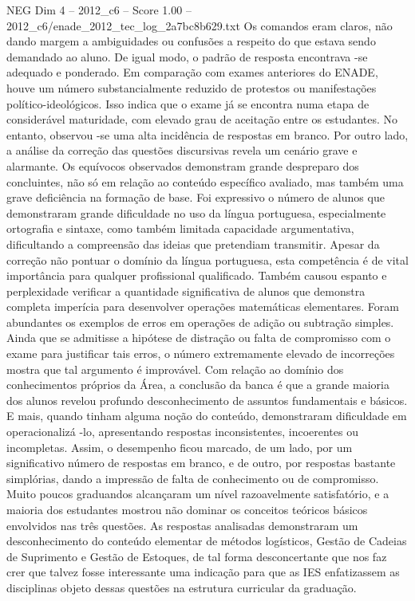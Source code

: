 \begin{textsample}{NEG Dim 4 – 2012\_c6 – Score 1.00 – 2012\_c6/enade\_2012\_tec\_log\_2a7bc8b629.txt}
Os comandos eram claros, não dando margem a ambiguidades ou confusões a respeito do que estava sendo demandado ao aluno.
De igual modo, o padrão de resposta encontrava -se adequado e ponderado.
Em comparação com exames anteriores do ENADE, houve um número substancialmente reduzido de protestos ou manifestações político-ideológicos.
Isso indica que o exame já se encontra numa etapa de considerável maturidade, com elevado grau de aceitação entre os estudantes.
No entanto, observou -se uma alta incidência de respostas em branco.
Por outro lado, a análise da correção das questões discursivas revela um cenário grave e alarmante.
Os equívocos observados demonstram grande despreparo dos concluintes, não só em relação ao conteúdo específico avaliado, mas também uma grave deficiência na formação de base.
Foi expressivo o número de alunos que demonstraram grande dificuldade no uso da língua portuguesa, especialmente ortografia e sintaxe, como também limitada capacidade argumentativa, dificultando a compreensão das ideias que pretendiam transmitir.
Apesar da correção não pontuar o domínio da língua portuguesa, esta competência é de vital importância para qualquer profissional qualificado.
Também causou espanto e perplexidade verificar a quantidade significativa de alunos que demonstra completa imperícia para desenvolver operações matemáticas elementares.
Foram abundantes os exemplos de erros em operações de adição ou subtração simples.
Ainda que se admitisse a hipótese de distração ou falta de compromisso com o exame para justificar tais erros, o número extremamente elevado de incorreções mostra que tal argumento é improvável.
Com relação ao domínio dos conhecimentos próprios da Área, a conclusão da banca é que a grande maioria dos alunos revelou profundo desconhecimento de assuntos fundamentais e básicos.
E mais, quando tinham alguma noção do conteúdo, demonstraram dificuldade em operacionalizá -lo, apresentando respostas inconsistentes, incoerentes ou incompletas.
Assim, o desempenho ficou marcado, de um lado, por um significativo número de respostas em branco, e de outro, por respostas bastante simplórias, dando a impressão de falta de conhecimento ou de compromisso.
Muito poucos graduandos alcançaram um nível razoavelmente satisfatório, e a maioria dos estudantes mostrou não dominar os conceitos teóricos básicos envolvidos nas três questões.
As respostas analisadas demonstraram um desconhecimento do conteúdo elementar de métodos logísticos, Gestão de Cadeias de Suprimento e Gestão de Estoques, de tal forma desconcertante que nos faz crer que talvez fosse interessante uma indicação para que as IES enfatizassem as disciplinas objeto dessas questões na estrutura curricular da graduação.

\end{textsample}
